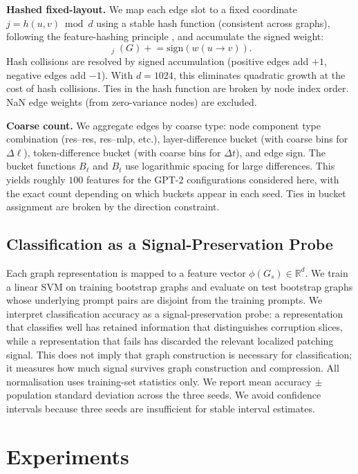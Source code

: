 \documentclass[11pt,a4paper]{article}
\newcommand{\R}{\mathbb{R}}
\newcommand{\sign}{\mathrm{sign}}
\newcommand{\weight}{w}
\newcommand{\fixhashed}{\mathop{\phi_{\mathrm{hashed}}}\nolimits}
\begin{document}
\textbf{Hashed fixed-layout.} We map each edge slot to a fixed coordinate $j = h(u, v) \bmod d$ using a stable hash function (consistent across graphs), following the feature-hashing principle \cite{weinberger2009feature}, and accumulate the signed weight:
\begin{equation}
\fixhashed_j(G) \mathrel{+}= \sign(\weight(u \rightarrow v)).
\end{equation}
Hash collisions are resolved by signed accumulation (positive edges add $+1$, negative edges add $-1$). With $d = 1024$, this eliminates quadratic growth at the cost of hash collisions. Ties in the hash function are broken by node index order. NaN edge weights (from zero-variance nodes) are excluded.

\textbf{Coarse count.} We aggregate edges by coarse type: node component type combination (res--res, res--mlp, etc.), layer-difference bucket (with coarse bins for $\Delta\ell$), token-difference bucket (with coarse bins for $\Delta t$), and edge sign. The bucket functions $B_\ell$ and $B_t$ use logarithmic spacing for large differences. This yields roughly $100$ features for the GPT-2 configurations considered here, with the exact count depending on which buckets appear in each seed. Ties in bucket assignment are broken by the direction constraint.

\subsection{Classification as a Signal-Preservation Probe}

Each graph representation is mapped to a feature vector $\phi(G_s) \in \R^d$. We train a linear SVM \cite{cortes1995support} on training bootstrap graphs and evaluate on test bootstrap graphs whose underlying prompt pairs are disjoint from the training prompts. We interpret classification accuracy as a signal-preservation probe: a representation that classifies well has retained information that distinguishes corruption slices, while a representation that fails has discarded the relevant localized patching signal. This does not imply that graph construction is necessary for classification; it measures how much signal survives graph construction and compression. All normalisation uses training-set statistics only. We report mean accuracy $\pm$ population standard deviation across the three seeds. We avoid confidence intervals because three seeds are insufficient for stable interval estimates.

\section{Experiments}
\end{document}
